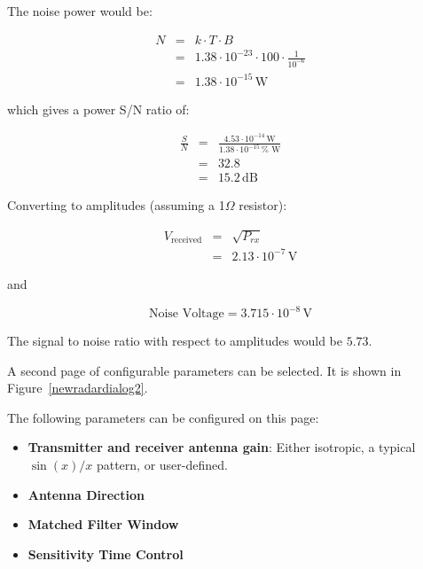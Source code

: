 The noise power would be:

\begin{eqnarray}
N &=&k\cdot T\cdot B \\
&=&1.38\cdot 10^{-23}\cdot 100\cdot \frac{1}{10^{-6}} \\
&=&1.38\cdot 10^{-15}\,\text{W}
\end{eqnarray}

which gives a power S/N ratio of:

\begin{eqnarray}
\frac{S}{N} &=&\frac{4.53\cdot 10^{-14}\,\text{W}}{1.38\cdot 10^{-15}\,\text{%
W}} \\
&=&32.8 \\
&=&15.2\,\text{dB}
\end{eqnarray}

Converting to amplitudes (assuming a 1$\Omega $ resistor):

\begin{eqnarray}
V_{\text{received}} &=&\sqrt{P_{rx}} \\
&=&2.13\cdot 10^{-7}\,\text{V}
\end{eqnarray}

and

\begin{equation}
\text{Noise Voltage}=3.715\cdot 10^{-8}\,\text{V}
\end{equation}

The signal to noise ratio with respect to amplitudes would be $5.73$.

A second page of configurable parameters can be selected. It is shown in
Figure~\ref{newradardialog2}.

The
following parameters can be configured on this page:

\begin{itemize}
\item  \textbf{Transmitter and receiver antenna gain}: Either isotropic, a
typical $\sin (x)/x$ pattern, or user-defined.

\item  \textbf{Antenna Direction}

\item  \textbf{Matched Filter Window}

\item  \textbf{Sensitivity Time Control}
\end{itemize}

